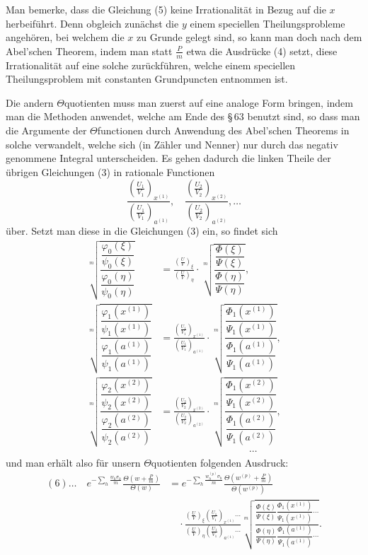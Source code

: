 \documentclass[10pt]{article}
\begin{document}
Man bemerke, dass die Gleichung (5) keine Irrationalität in Bezug auf die \(x\) herbeiführt. Denn obgleich zunächst die \(y\) einem speciellen Theilungsprobleme angehören, bei welchem die \(x\) zu Grunde gelegt sind, so kann man doch nach dem Abel'schen Theorem, indem man statt \(\frac Pm\) etwa die Ausdrücke (4) setzt, diese Irrationalität auf eine solche zurückführen, welche einem speciellen Theilungsproblem mit constanten Grundpuncten entnommen ist.

Die andern \(\Theta\)quotienten muss man zuerst auf eine analoge Form bringen, indem man die Methoden anwendet, welche am Ende des \S\,63 benutzt sind, so dass man die Argumente der \(\Theta\)functionen durch Anwendung des Abel'schen Theorems in solche verwandelt, welche sich (in Zähler und Nenner) nur durch das negativ genommene Integral unterscheiden. Es gehen dadurch die linken Theile der übrigen Gleichungen (3) in rationale Functionen
\[
\frac{\left(\frac{U_1}{V_1}\right)_{x^{(1)}}}{\left(\frac{U_1}{V_1}\right)_{a^{(1)}}},\quad
\frac{\left(\frac{U_2}{V_2}\right)_{x^{(2)}}}{\left(\frac{U_2}{V_2}\right)_{a^{(2)}}},\ldots
\]
über. Setzt man diese in die Gleichungen (3) ein, so findet sich
\[
\begin{aligned}
\sqrt[m]{\dfrac{\dfrac{\varphi_0(\xi)}{\psi_0(\xi)}}{\dfrac{\varphi_0(\eta)}{\psi_0(\eta)}}}
&=
\frac{\left(\frac{U}{V}\right)_\xi}{\left(\frac{U}{V}\right)_\eta}
\cdot
\sqrt[m]{\dfrac{\dfrac{\Phi(\xi)}{\Psi(\xi)}}{\dfrac{\Phi(\eta)}{\Psi(\eta)}}},\\
\sqrt[m]{\dfrac{\dfrac{\varphi_1(x^{(1)})}{\psi_1(x^{(1)})}}{\dfrac{\varphi_1(a^{(1)})}{\psi_1(a^{(1)})}}}
&=
\frac{\left(\frac{U_1}{V_1}\right)_{x^{(1)}}}{\left(\frac{U_1}{V_1}\right)_{a^{(1)}}}
\cdot
\sqrt[m]{\dfrac{\dfrac{\Phi_1(x^{(1)})}{\Psi_1(x^{(1)})}}{\dfrac{\Phi_1(a^{(1)})}{\Psi_1(a^{(1)})}}},\\
\sqrt[m]{\dfrac{\dfrac{\varphi_2(x^{(2)})}{\psi_2(x^{(2)})}}{\dfrac{\varphi_2(a^{(2)})}{\psi_2(a^{(2)})}}}
&=
\frac{\left(\frac{U_2}{V_2}\right)_{x^{(2)}}}{\left(\frac{U_2}{V_2}\right)_{a^{(2)}}}
\cdot
\sqrt[m]{\dfrac{\dfrac{\Phi_1(x^{(2)})}{\Psi_1(x^{(2)})}}{\dfrac{\Phi_1(a^{(2)})}{\Psi_1(a^{(2)})}}},\\
&\hspace{9em}\cdots
\end{aligned}
\]
und man erhält also für unsern \(\Theta\)quotienten folgenden Ausdruck:
\[
\begin{aligned}
(6)\ldots\quad
e^{-\sum_h\frac{w_h\sigma_h}{m}}
\frac{\Theta\left(w+\frac Pm\right)}{\Theta(w)}
&=
e^{-\sum_h\frac{w_h^{(p)}\sigma_h}{m}}
\frac{\Theta\left(w^{(p)}+\frac Pm\right)}{\Theta(w^{(p)})}\\
&\quad{}\cdot
\frac{\left(\frac UV\right)_\xi\left(\frac{U_1}{V_1}\right)_{x^{(1)}}\cdots}
     {\left(\frac UV\right)_\eta\left(\frac{U_1}{V_1}\right)_{a^{(1)}}\cdots}
\sqrt[m]{\frac{
\dfrac{\Phi(\xi)}{\Psi(\xi)}\dfrac{\Phi_1(x^{(1)})}{\Psi_1(x^{(1)})}\cdots
}{
\dfrac{\Phi(\eta)}{\Psi(\eta)}\dfrac{\Phi_1(a^{(1)})}{\Psi_1(a^{(1)})}\cdots
}}.
\end{aligned}
\]
\end{document}
